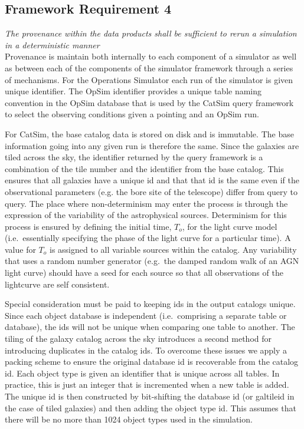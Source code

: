 \documentclass[]{article}
\begin{document}
\subsection{Framework Requirement 4} 
\label{sec:determine}
{\it The provenance within the data products shall be sufficient to rerun a simulation in a 
deterministic manner}\\

Provenance is maintain both internally to each component of a
simulator as well as between each of the components
of the simulator framework through a series of mechanisms. For the
Operations Simulator each run of the simulator is given unique
identifier.  The OpSim identifier provides a unique table naming
convention in the OpSim database that is used by the CatSim query
framework to select the observing conditions given a pointing and an
OpSim run. 

For CatSim, the base catalog data is stored on disk and is
immutable. The base information going into any given run is therefore
the same.  Since the galaxies are tiled across the sky, the identifier
returned by the query framework is a combination of the tile number
and the identifier from the base catalog. This ensures that all
galaxies have a unique id and that that id is the same even if the
observational parameters (e.g. the bore site of the telescope) differ
from query to query.  The place where non-determinism may enter the
process is through the expression of the variability of the
astrophysical sources. Determinism for this process is ensured by
defining the initial time, $T_o$, for the light curve model (i.e.\
essentially specifying the phase of the light curve for a particular
time). A value for $T_o$ is assigned to all variable sources within
the catalog.  Any variability that uses a random number
generator (e.g.\ the damped random walk of an AGN light curve) should have a
seed for each source so that all observations of the lightcurve are self consistent.

Special consideration must be paid to keeping ids in the output
catalogs unique.  Since each object database is independent (i.e.\
comprising a separate table or database), the ids will not be unique
when comparing one table to another. The tiling of the galaxy catalog
across the sky introduces a second method for introducing duplicates
in the catalog ids. To overcome these issues we apply a packing scheme
to ensure the original database id is recoverable from the catalog id.
Each object type is given an identifier that is unique across all
tables.  In practice, this is just an integer that is incremented when
a new table is added.  The unique id is then constructed by
bit-shifting the database id (or galtileid in the case of tiled
galaxies) and then adding the object type id.  This assumes that there will
be no more than 1024 object types used in the simulation.
\end{document}

